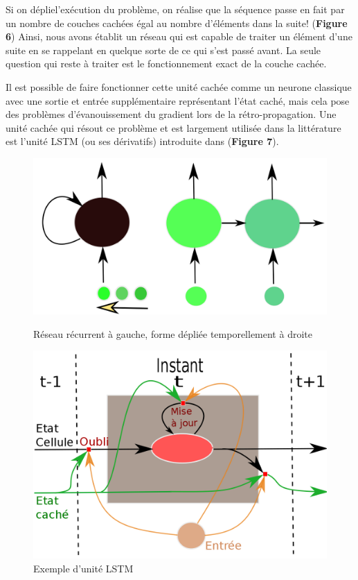 \documentclass[a4paper, 11pt, onecolumn]{article}
\begin{document}
Si on \og déplie\fg l'exécution du problème, on réalise que la séquence passe en
fait par un nombre de couches cachées égal au nombre d'éléments dans la suite!
(\textbf{Figure 6})
Ainsi, nous avons établit un réseau qui est capable de traiter un élément d'une
suite en se rappelant en quelque sorte de ce qui s'est passé avant. La seule
question qui reste à traiter est le fonctionnement exact de la couche cachée.

Il est possible de faire fonctionner cette unité cachée comme un neurone classique avec une sortie et entrée supplémentaire
représentant l'état caché, mais cela pose des problèmes d'évanouissement du
gradient lors de la rétro-propagation. Une unité cachée qui résout ce problème et
est largement utilisée dans la littérature est l'unité LSTM (ou ses dérivatifs)
introduite dans \cite{hochreiter1997long} (\textbf{Figure 7}).

\begin{figure}[!tbp]
  \centering
  \begin{minipage}[b]{0.45\textwidth}
    \includegraphics[width=\textwidth]{Recurrent}
    \caption{Réseau récurrent à gauche, forme dépliée temporellement à droite}
  \end{minipage}
  \hfill
  \begin{minipage}[b]{0.5\textwidth}
    \includegraphics[width=\textwidth]{LSTM}
    \caption{Exemple d'unité LSTM}
  \end{minipage}

\end{figure}
\end{document}
